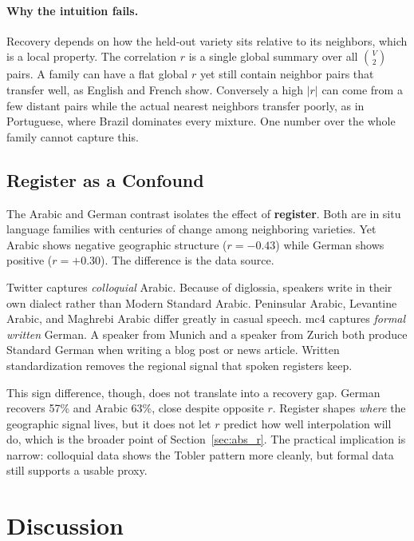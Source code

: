 \documentclass[11pt]{article}
\begin{document}
\paragraph{Why the intuition fails.}
Recovery depends on how the held-out variety sits relative to its neighbors, which is a local property.
The correlation $r$ is a single global summary over all $\binom{V}{2}$ pairs.
A family can have a flat global $r$ yet still contain neighbor pairs that transfer well, as English and French show.
Conversely a high $|r|$ can come from a few distant pairs while the actual nearest neighbors transfer poorly, as in Portuguese, where Brazil dominates every mixture.
One number over the whole family cannot capture this.

\subsection{Register as a Confound}
\label{sec:register}

The Arabic and German contrast isolates the effect of \textbf{register}.
Both are in situ language families with centuries of change among neighboring varieties.
Yet Arabic shows negative geographic structure ($r{=}{-}0.43$) while German shows positive ($r{=}{+}0.30$).
The difference is the data source.

Twitter captures \emph{colloquial} Arabic.
Because of diglossia, speakers write in their own dialect rather than Modern Standard Arabic.
Peninsular Arabic, Levantine Arabic, and Maghrebi Arabic differ greatly in casual speech. mc4 captures \emph{formal written} German.
A speaker from Munich and a speaker from Zurich both produce Standard German when writing a blog post or news article.
Written standardization removes the regional signal that spoken registers keep.

This sign difference, though, does not translate into a recovery gap.
German recovers 57\% and Arabic 63\%, close despite opposite $r$.
Register shapes \emph{where} the geographic signal lives, but it does not let $r$ predict how well interpolation will do, which is the broader point of Section~\ref{sec:abs_r}.
The practical implication is narrow: colloquial data shows the Tobler pattern more cleanly, but formal data still supports a usable proxy.

\section{Discussion}
\label{sec:discussion}
\end{document}
